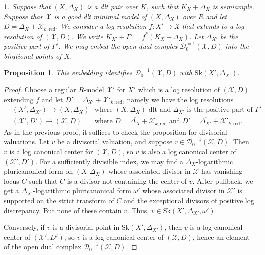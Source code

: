 \documentclass{amsart}%
\numberwithin{equation}{subsection}
\theoremstyle{plain2}
\newtheorem{prop}[equation]{Proposition}
\theoremstyle{definition2}
\theoremstyle{stepstyle}
\theoremstyle{point}
\theoremstyle{subpoint}
\newtheorem{subpoint}[equation]{}%
\newcommand{\spa}[1]{\begin{subpoint}#1\end{subpoint}}           %
\newcommand{\cX}{\ensuremath{\mathscr{X}}}
\newcommand{\redu}{\mathrm{red}}
\newcommand{\Sk}{\mathrm{Sk}}
\begin{document}
\spa{Suppose that $(X,\Delta_X)$ is a dlt pair over $K$, such that $K_X + \Delta_X$ is semiample. Suppose thar $\cX$ is a good dlt minimal model of $(X,\Delta_X)$ over $R$ and let $D=\overline{\Delta_X} + \cX_{k,\redu}$. We consider a log resolution $f:X' \rightarrow X$ that extends to a log resolution of $(\cX,D)$. We write $K_{X'} + \Gamma' = f^*(K_X + \Delta_X)$. Let $\Delta_{X'}$ be the positive part of $\Gamma'$. We may embed the open dual complex $\mathcal{D}_0^{=1}(\cX, D)$ into the birational points of $X$.
}
\begin{prop} \label{prop dual complex minimal good dlt = essential skeleton any resolution}
This embedding identifies $\mathcal{D}_0^{=1}(\cX, D)$ with $\Sk(X',\Delta_{X'})$.
\end{prop}
\begin{proof}
Choose a regular $R$-model $\cX'$ for $X'$ which is a log resolution of $(\cX, D)$ extending $f$ and let  $D'=\overline{\Delta_{X'}} + \cX'_{k,\redu}$, namely we have the log resolutions \begin{align*}
&(X', \Delta_{X'}) \rightarrow (X,\Delta_X) & \text{where }(X,\Delta_X) \text{ dlt and }\Delta_{X'} \text{ is the positive part of }\Gamma'\\
&(\cX', D') \rightarrow (\cX,D) & \text{where }D=\overline{\Delta_X} + \cX_{k,\redu} \text{ and } D'=\overline{\Delta_{X'}} + \cX'_{k,\redu}.
\end{align*} As in the previous proof, it suffices to check the proposition for divisorial valuations. Let $v$ be a divisorial valuation, and suppose $v \in \mathcal{D}_0^{=1}(\cX,D)$. Then $v$ is a log canonical center for $(\cX,D)$, so $v$ is also a log canonical center of $(\cX', D')$. For a sufficiently divisible index, we may find a $\Delta_X$-logarithmic pluricanonical form on $(X,\Delta_X)$ whose associated divisor in $\cX$ has vanishing locus $C$ such that $C$ is a divisor not containing the center of $v$. After pullback, we get a $\Delta_{X'}$-logarithmic pluricanonical form $\omega'$ whose associated divisor in $\cX'$ is supported on the strict transform of $C$ and the exceptional divisors of positive log discrepancy. But none of these contain $v$. Thus, $v \in \Sk(X',\Delta_{X'},\omega')$.

Conversely, if $v$ is a divisorial point in $\Sk(X', \Delta_{X'})$, then $v$ is a log canonical center of $(\cX', D')$, so $v$ is a log canonical center of $(\cX, D)$, hence an element of the open dual complex $\mathcal{D}_0^{=1}(\cX, D)$.
\end{proof}
\end{document}
